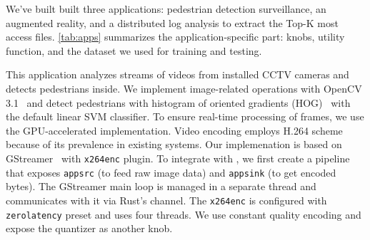 




We've built built three applications: pedestrian detection surveillance, an
augmented reality, and a distributed log analysis to extract the Top-K most
access files. \autoref{tab:apps} summarizes the application-specific part:
knobs, utility function, and the dataset we used for training and testing.

 This application analyzes streams of videos from
installed CCTV cameras and detects pedestrians inside. We implement
image-related operations with OpenCV 3.1~\cite{opencvlibrary} and detect
pedestrians with histogram of oriented gradients
(HOG)~\cite{dalal2005histograms} with the default linear SVM classifier. To
ensure real-time processing of frames, we use the GPU-accelerated
implementation. Video encoding employs H.264 scheme because of its prevalence in
existing systems. Our implemenation is based on GStreamer~\cite{gstreamer} with
\texttt{x264enc} plugin. To integrate with \sysname{}, we first create a
pipeline that exposes \texttt{appsrc} (to feed raw image data) and
\texttt{appsink} (to get encoded bytes). The GStreamer main loop is managed in a
separate thread and \sysname{} communicates with it via Rust's channel. The
\texttt{x264enc} is configured with \texttt{zerolatency} preset and uses four
threads. We use constant quality encoding and expose the quantizer as another
knob.

